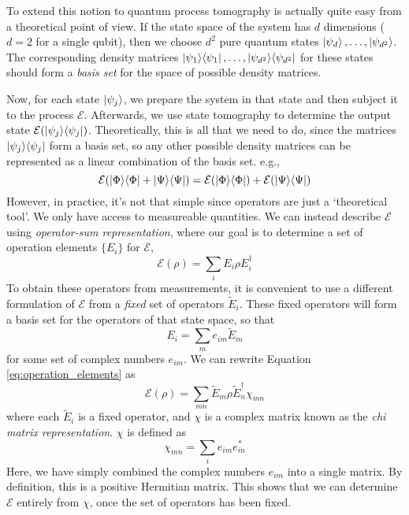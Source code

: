 To extend this notion to quantum process tomography is actually quite easy from a theoretical point
of view. If the state space of the system has $d$ dimensions ($d = 2$ for a single qubit), then we
choose $d^2$ pure quantum states $\ket{\psi_d}, \dots, \ket{\psi_{d^2}}$. The corresponding density
matrices $\ket{\psi_1}\!\bra{\psi_1}, \dots, \ket{\psi_{d^2}}\!\bra{\psi_{d^2}}$ for these states should
form a \textit{basis set} for the space of possible density matrices. 

Now, for each state $\ket{\psi_j}$, we prepare the system in that state and then subject it to the
process $\mathcal{E}$. Afterwards, we use state tomography to determine the output state
$\mathcal{E}(\ket{\psi_j}\!\bra{\psi_j})$. Theoretically, this is all that we need to do, since the
matrices $\ket{\psi_j}\!\bra{\psi_j}$ form a basis set, so any other possible density matrices can be
represented as a linear combination of the basis set. e.g.,
\begin{equation}
    \mathcal{E}(\ket{\Phi}\!\bra{\Phi} + \ket{\Psi}\!\bra{\Psi}) = 
    \mathcal{E}(\ket{\Phi}\!\bra{\Phi}) + \mathcal{E}(\ket{\Psi}\!\bra{\Psi})
\end{equation}
However, in practice, it's not that simple since operators are just a `theoretical tool'. We only
have access to measureable quantities. We can instead describe $\mathcal{E}$ using
\textit{operator-sum representation}, where our goal is to determine a set of operation elements
$\{E_i\}$ for $\mathcal{E}$,
\begin{equation} \label{eq:operation_elements}
    \mathcal{E}(\rho) = \sum_i E_i \rho E_i^{\dagger} 
\end{equation}
To obtain these operators from measurements, it is convenient to use a different formulation of
$\mathcal{E}$ from a \textit{fixed} set of operators $\tilde{E}_i$. These fixed operators will form
a basis set for the operators of that state space, so that
\begin{equation}
    E_i = \sum_m e_{im} \tilde{E}_m
\end{equation}
for some set of complex numbers $e_{im}$. We can rewrite Equation \ref{eq:operation_elements} as
\begin{equation} \label{eq:chi_matrix_representation}
    \mathcal{E}(\rho) = \sum_{mn} \tilde{E}_m \rho \tilde{E}_n^{\dagger} \chi_{mn}
\end{equation}
where each $\tilde{E}_i$ is a fixed operator, and $\chi$ is a complex matrix known as the
\textit{chi matrix representation}. $\chi$ is defined as
\begin{equation}
    \chi_{mn} = \sum_i e_{im} e_{in}^*
\end{equation}
Here, we have simply combined the complex numbers $e_{im}$ into a single matrix. By definition, this
is a positive Hermitian matrix. This shows that we can determine $\mathcal{E}$ entirely from $\chi$,
once the set of operators has been fixed. 

